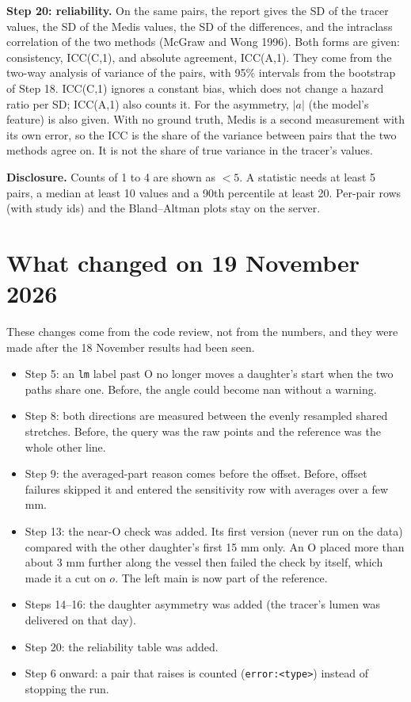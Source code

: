\documentclass[11pt,a4paper]{article}
\newcommand{\code}[1]{\texttt{#1}}
\begin{document}
\textbf{Step 20: reliability.} On the same pairs, the report gives the SD of the tracer values, the SD of
the Medis values, the SD of the differences, and the intraclass correlation of the two methods (McGraw and
Wong 1996). Both forms are given: consistency, ICC(C,1), and absolute agreement, ICC(A,1). They come from
the two-way analysis of variance of the pairs, with 95\% intervals from the bootstrap of Step 18. ICC(C,1)
ignores a constant bias, which does not change a hazard ratio per SD; ICC(A,1) also counts it. For the
asymmetry, $|a|$ (the model's feature) is also given. With no ground truth, Medis is a second measurement
with its own error, so the ICC is the share of the variance between pairs that the two methods agree on. It
is not the share of true variance in the tracer's values.

\textbf{Disclosure.} Counts of 1 to 4 are shown as $<5$. A statistic needs at least 5 pairs, a median at
least 10 values and a 90th percentile at least 20. Per-pair rows (with study ids) and the Bland--Altman
plots stay on the server.

\section{What changed on 19 November 2026}\label{sec:changes}

These changes come from the code review, not from the numbers, and they were made after the
18 November results had been seen.
\begin{itemize}
\item Step 5: an \code{lm} label past O no longer moves a daughter's start when the two paths share one.
  Before, the angle could become nan without a warning.
\item Step 8: both directions are measured between the evenly resampled shared stretches. Before, the
  query was the raw points and the reference was the whole other line.
\item Step 9: the averaged-part reason comes before the offset. Before, offset failures skipped it and
  entered the sensitivity row with averages over a few mm.
\item Step 13: the near-O check was added. Its first version (never run on the data) compared with the
  other daughter's first 15 mm only. An O placed more than about 3 mm further along the vessel then failed
  the check by itself, which made it a cut on $o$. The left main is now part of the reference.
\item Steps 14--16: the daughter asymmetry was added (the tracer's lumen was delivered on that day).
\item Step 20: the reliability table was added.
\item Step 6 onward: a pair that raises is counted (\code{error:<type>}) instead of stopping the run.
\end{itemize}
\end{document}
